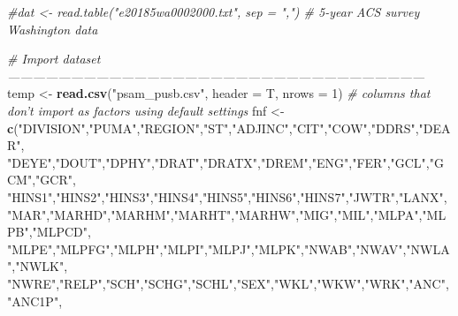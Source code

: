 \documentclass[
]{article}
\newenvironment{Shaded}{\begin{snugshade}}{\end{snugshade}}
\newcommand{\CommentTok}[1]{\textcolor[rgb]{0.56,0.35,0.01}{\textit{#1}}}
\newcommand{\DataTypeTok}[1]{\textcolor[rgb]{0.13,0.29,0.53}{#1}}
\newcommand{\DecValTok}[1]{\textcolor[rgb]{0.00,0.00,0.81}{#1}}
\newcommand{\KeywordTok}[1]{\textcolor[rgb]{0.13,0.29,0.53}{\textbf{#1}}}
\newcommand{\NormalTok}[1]{#1}
\newcommand{\StringTok}[1]{\textcolor[rgb]{0.31,0.60,0.02}{#1}}
\begin{document}
\begin{Shaded}
\begin{Highlighting}[]
\CommentTok{#dat <- read.table("e20185wa0002000.txt", sep = ",")    # 5-year ACS survey Washington data}

\CommentTok{# Import dataset ---------------------------------------------------------------------------------------------------}
\NormalTok{temp <-}\StringTok{ }\KeywordTok{read.csv}\NormalTok{(}\StringTok{"psam_pusb.csv"}\NormalTok{, }\DataTypeTok{header =}\NormalTok{ T, }\DataTypeTok{nrows =} \DecValTok{1}\NormalTok{)}
\CommentTok{# columns that don't import as factors using default settings}
\NormalTok{fnf <-}\StringTok{ }\KeywordTok{c}\NormalTok{(}\StringTok{"DIVISION"}\NormalTok{,}\StringTok{"PUMA"}\NormalTok{,}\StringTok{"REGION"}\NormalTok{,}\StringTok{"ST"}\NormalTok{,}\StringTok{"ADJINC"}\NormalTok{,}\StringTok{"CIT"}\NormalTok{,}\StringTok{"COW"}\NormalTok{,}\StringTok{"DDRS"}\NormalTok{,}\StringTok{"DEAR"}\NormalTok{,}
         \StringTok{"DEYE"}\NormalTok{,}\StringTok{"DOUT"}\NormalTok{,}\StringTok{"DPHY"}\NormalTok{,}\StringTok{"DRAT"}\NormalTok{,}\StringTok{"DRATX"}\NormalTok{,}\StringTok{"DREM"}\NormalTok{,}\StringTok{"ENG"}\NormalTok{,}\StringTok{"FER"}\NormalTok{,}\StringTok{"GCL"}\NormalTok{,}\StringTok{"GCM"}\NormalTok{,}\StringTok{"GCR"}\NormalTok{,}
         \StringTok{"HINS1"}\NormalTok{,}\StringTok{"HINS2"}\NormalTok{,}\StringTok{"HINS3"}\NormalTok{,}\StringTok{"HINS4"}\NormalTok{,}\StringTok{"HINS5"}\NormalTok{,}\StringTok{"HINS6"}\NormalTok{,}\StringTok{"HINS7"}\NormalTok{,}\StringTok{"JWTR"}\NormalTok{,}\StringTok{"LANX"}\NormalTok{,}
         \StringTok{"MAR"}\NormalTok{,}\StringTok{"MARHD"}\NormalTok{,}\StringTok{"MARHM"}\NormalTok{,}\StringTok{"MARHT"}\NormalTok{,}\StringTok{"MARHW"}\NormalTok{,}\StringTok{"MIG"}\NormalTok{,}\StringTok{"MIL"}\NormalTok{,}\StringTok{"MLPA"}\NormalTok{,}\StringTok{"MLPB"}\NormalTok{,}\StringTok{"MLPCD"}\NormalTok{,}
         \StringTok{"MLPE"}\NormalTok{,}\StringTok{"MLPFG"}\NormalTok{,}\StringTok{"MLPH"}\NormalTok{,}\StringTok{"MLPI"}\NormalTok{,}\StringTok{"MLPJ"}\NormalTok{,}\StringTok{"MLPK"}\NormalTok{,}\StringTok{"NWAB"}\NormalTok{,}\StringTok{"NWAV"}\NormalTok{,}\StringTok{"NWLA"}\NormalTok{,}\StringTok{"NWLK"}\NormalTok{,}
         \StringTok{"NWRE"}\NormalTok{,}\StringTok{"RELP"}\NormalTok{,}\StringTok{"SCH"}\NormalTok{,}\StringTok{"SCHG"}\NormalTok{,}\StringTok{"SCHL"}\NormalTok{,}\StringTok{"SEX"}\NormalTok{,}\StringTok{"WKL"}\NormalTok{,}\StringTok{"WKW"}\NormalTok{,}\StringTok{"WRK"}\NormalTok{,}\StringTok{"ANC"}\NormalTok{,}\StringTok{"ANC1P"}\NormalTok{,}

\end{Highlighting}
\end{Shaded}
\end{document}
